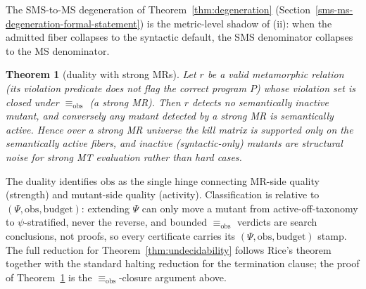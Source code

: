 \documentclass[review,12pt,authoryear]{elsarticle}
\newtheorem{theorem}{Theorem}
\begin{document}
The SMS-to-MS degeneration of
Theorem~\ref{thm:degeneration} (Section~\ref{sms-ms-degeneration-formal-statement}) is the metric-level shadow of (ii): when the admitted
fiber collapses to the syntactic default, the SMS denominator collapses
to the MS denominator.

\begin{theorem}[duality with strong MRs]\label{thm:duality}
Let $r$ be a valid
metamorphic relation (its violation predicate does not flag the correct
program $P$) whose violation set is closed under $\equiv_{\mathrm{obs}}$
(a \emph{strong} MR). Then $r$ detects no semantically inactive
mutant, and conversely any mutant detected by a strong MR is
semantically active. Hence over a strong MR universe the kill matrix
is supported only on the semantically active fibers, and inactive
(syntactic-only) mutants are structural noise for strong MT evaluation
rather than hard cases.
\end{theorem}

The duality identifies $\mathrm{obs}$ as the single hinge connecting MR-side
quality (strength) and mutant-side quality (activity). Classification
is relative to $(\Psi, \mathrm{obs}, \text{budget})$: extending $\Psi$ can only move
a mutant from active-off-taxonomy to $\psi$-stratified, never the
reverse, and bounded $\equiv_{\mathrm{obs}}$ verdicts are search conclusions,
not proofs, so every certificate carries its $(\Psi, \mathrm{obs}, \text{budget})$
stamp. The full reduction for Theorem~\ref{thm:undecidability} follows Rice's theorem together
with the standard halting reduction for the termination clause; the
proof of Theorem~\ref{thm:duality} is the $\equiv_{\mathrm{obs}}$-closure argument above.
\end{document}
